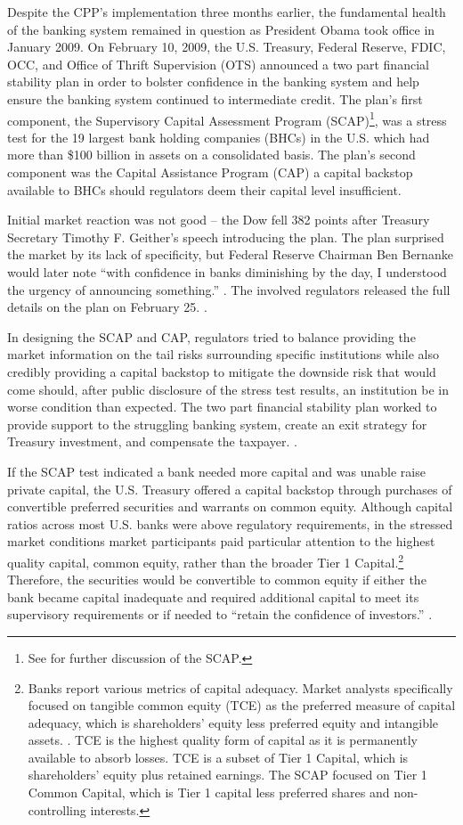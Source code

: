 \documentclass[12pt]{article}
\begin{document}
Despite the CPP's implementation three months earlier, the fundamental health of the banking system remained in question as President Obama took office in January 2009. On February 10, 2009, the U.S. Treasury, Federal Reserve, FDIC, OCC, and Office of Thrift Supervision (OTS) announced a two part financial stability plan in order to bolster confidence in the banking system and help ensure the banking system continued to intermediate credit. The plan's first component, the Supervisory Capital Assessment Program (SCAP)\footnote{See \citet{Ross2016b} for further discussion of the SCAP.}, was a stress test for the 19 largest bank holding companies (BHCs) in the U.S. which had more than \$100 billion in assets on a consolidated basis. The plan's second component was the Capital Assistance Program (CAP) a capital backstop available to BHCs should regulators deem their capital level insufficient. 

Initial market reaction was not good -- the Dow fell 382 points after Treasury Secretary Timothy F. Geither's speech introducing the plan. The plan surprised the market by its lack of specificity, but Federal Reserve Chairman Ben Bernanke would later note ``with confidence in banks diminishing by the day, I understood the urgency of announcing something.'' \citep{Bernanke}. The involved regulators released the full details on the plan on February 25. \citep{CAPTerms}.


In designing the SCAP and CAP, regulators tried to balance providing the market information on the tail risks surrounding specific institutions while also credibly providing a capital backstop to mitigate the downside risk that would come should, after public disclosure of the stress test results, an institution be in worse condition than expected. The two part financial stability plan worked to provide support to the struggling banking system, create an exit strategy for Treasury investment, and compensate the taxpayer. \citep{GW}.


If the SCAP test indicated a bank needed more capital and was unable raise private capital, the U.S. Treasury offered a capital backstop through purchases of convertible preferred securities and warrants on common equity. Although capital ratios across most U.S. banks were above regulatory requirements, in the stressed market conditions market participants paid particular attention to the highest quality capital, common equity, rather than the broader Tier 1 Capital.\footnote{Banks report various metrics of capital adequacy. Market analysts specifically focused on tangible common equity (TCE) as the preferred measure of capital adequacy, which is shareholders' equity less preferred equity and intangible assets. \citep{GW}. TCE is the highest quality form of capital as it is permanently available to absorb losses. TCE is a subset of Tier 1 Capital, which is shareholders' equity plus retained earnings. The SCAP focused on Tier 1 Common Capital, which is Tier 1 capital less preferred shares and non-controlling interests.} Therefore, the securities would be convertible to common equity if either the bank became capital inadequate and required additional capital to meet its supervisory requirements or if needed to ``retain the confidence of investors.'' \citep{WhitePaper}.
\end{document}
